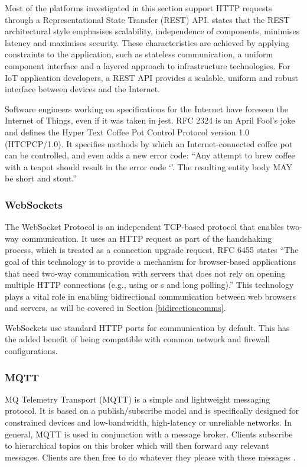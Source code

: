         Most of the platforms investigated in this section support HTTP requests through a Representational State Transfer (REST) API. \citet{rest:2000} states that the REST architectural style emphasises scalability, independence of components, minimises latency and maximises security. These characteristics are achieved by applying constraints to the application, such as stateless communication, a uniform component interface and a layered approach to infrastructure technologies. For IoT application developers, a REST API provides a scalable, uniform and robust interface between devices and the Internet.

        Software engineers working on specifications for the Internet have foreseen the Internet of Things, even if it was taken in jest. RFC 2324 \citep{rfc2324} is an April Fool's joke and defines the Hyper Text Coffee Pot Control Protocol version 1.0 (HTCPCP/1.0). It specifies methods by which an Internet-connected coffee pot can be controlled, and even adds a new error code: ``Any attempt to brew coffee with a teapot should result in the error code `'. The resulting entity body MAY be short and stout.''

      \subsubsection{WebSockets}
        The WebSocket Protocol is an independent TCP-based protocol that enables two-way communication. It uses an HTTP request as part of the handshaking process, which is treated as a connection upgrade request. RFC 6455 \citep{rfc6455} states ``The goal of this technology is to provide a mechanism for browser-based applications that need two-way communication with servers that does not rely on opening multiple HTTP connections (e.g., using  or s and long polling).'' This technology plays a vital role in enabling bidirectional communication between web browsers and servers, as will be covered in Section \ref{bidirectioncomms}.

        WebSockets use standard HTTP ports for communication by default. This has the added benefit of being compatible with common network and firewall configurations.

      \subsubsection{MQTT}
        \label{section:mqtt}
        MQ Telemetry Transport (MQTT) is a simple and lightweight messaging protocol. It is based on a publish/subscribe model and is specifically designed for constrained devices and low-bandwidth, high-latency or unreliable networks. In general, MQTT is used in conjunction with a message broker. Clients subscribe to hierarchical topics on this broker which will then forward any relevant messages. Clients are then free to do whatever they please with these messages \citep{mqtt:2015}.

